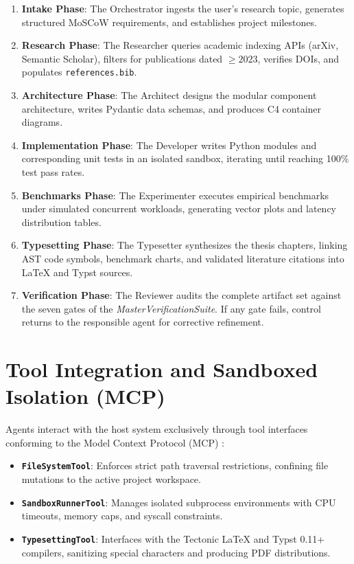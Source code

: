 \begin{enumerate}
    \item \textbf{Intake Phase}: The Orchestrator ingests the user's research topic, generates structured MoSCoW requirements, and establishes project milestones.
    \item \textbf{Research Phase}: The Researcher queries academic indexing APIs (arXiv, Semantic Scholar), filters for publications dated $\ge 2023$, verifies DOIs, and populates \texttt{references.bib}.
    \item \textbf{Architecture Phase}: The Architect designs the modular component architecture, writes Pydantic data schemas, and produces C4 container diagrams.
    \item \textbf{Implementation Phase}: The Developer writes Python modules and corresponding unit tests in an isolated sandbox, iterating until reaching 100\% test pass rates.
    \item \textbf{Benchmarks Phase}: The Experimenter executes empirical benchmarks under simulated concurrent workloads, generating vector plots and latency distribution tables.
    \item \textbf{Typesetting Phase}: The Typesetter synthesizes the thesis chapters, linking AST code symbols, benchmark charts, and validated literature citations into LaTeX and Typst sources.
    \item \textbf{Verification Phase}: The Reviewer audits the complete artifact set against the seven gates of the \emph{MasterVerificationSuite}. If any gate fails, control returns to the responsible agent for corrective refinement.
\end{enumerate}

\section{Tool Integration and Sandboxed Isolation (MCP)}
\label{sec:mcp_tool_integration}

Agents interact with the host system exclusively through tool interfaces conforming to the Model Context Protocol (MCP) \cite{AnthropicMCP2024}:
\begin{itemize}
    \item \textbf{\texttt{FileSystemTool}}: Enforces strict path traversal restrictions, confining file mutations to the active project workspace.
    \item \textbf{\texttt{SandboxRunnerTool}}: Manages isolated subprocess environments with CPU timeouts, memory caps, and syscall constraints.
    \item \textbf{\texttt{TypesettingTool}}: Interfaces with the Tectonic LaTeX and Typst 0.11+ compilers, sanitizing special characters and producing PDF distributions.
\end{itemize}

